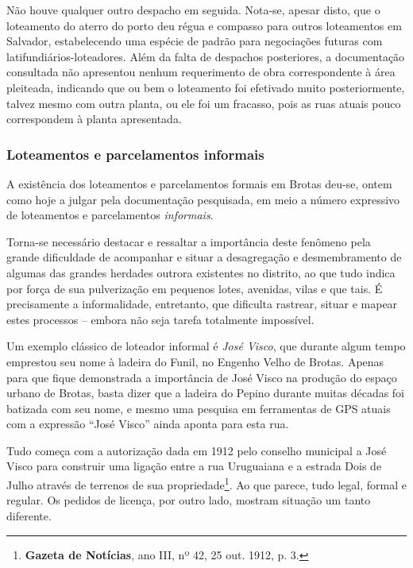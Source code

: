 Não houve qualquer outro despacho em seguida. Nota-se, apesar disto, que o loteamento do aterro do porto deu régua e compasso para outros loteamentos em Salvador, estabelecendo uma espécie de padrão para negociações futuras com latifundiários-loteadores. Além da falta de despachos posteriores, a documentação consultada não apresentou nenhum requerimento de obra correspondente à área pleiteada, indicando que ou bem o loteamento foi efetivado muito posteriormente, talvez mesmo com outra planta, ou ele foi um fracasso, pois as ruas atuais pouco correspondem à planta apresentada.

\subsubsection{Loteamentos e parcelamentos informais}

A existência dos loteamentos e parcelamentos formais em Brotas deu-se, ontem como hoje a julgar pela documentação pesquisada, em meio a número expressivo de loteamentos e parcelamentos \textit{informais}. 

Torna-se necessário destacar e ressaltar a importância deste fenômeno pela grande dificuldade de acompanhar e situar a desagregação e desmembramento de algumas das grandes herdades outrora existentes no distrito, ao que tudo indica por força de sua pulverização em pequenos lotes, avenidas, vilas e que tais. É precisamente a informalidade, entretanto, que dificulta rastrear, situar e mapear estes processos – embora não seja tarefa totalmente impossível.

Um exemplo clássico de loteador informal é \textit{José Visco}, que durante algum tempo emprestou seu nome à ladeira do Funil, no Engenho Velho de Brotas. Apenas para que fique demonstrada a importância de José Visco na produção do espaço urbano de Brotas, basta dizer que a ladeira do Pepino durante muitas décadas foi batizada com seu nome, e mesmo uma pesquisa em ferramentas de GPS atuais com a expressão ``José Visco'' ainda aponta para esta rua.

Tudo começa com a autorização dada em 1912 pelo conselho municipal a José Visco para construir uma ligação entre a rua Uruguaiana e a estrada Dois de Julho através de terrenos de sua propriedade\footnote{\textbf{Gazeta de Notícias}, ano III, nº 42, 25 out. 1912, p. 3.}. Ao que parece, tudo legal, formal e regular. Os pedidos de licença, por outro lado, mostram situação um tanto diferente.

